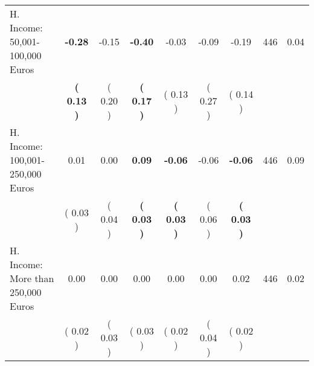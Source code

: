 \begin{tabular}{lcccccccc}
H. Income: 50,001-100,000 Euros & \textbf{    -0.28} &     -0.15 & \textbf{    -0.40} &     -0.03 &     -0.09 &     -0.19 & 446 &       0.04 \\ 
 & \textbf{(     0.13 )} & (     0.20 ) & \textbf{(     0.17 )} & (     0.13 ) & (     0.27 ) & (     0.14 ) & \\
H. Income: 100,001-250,000 Euros &      0.01 &      0.00 & \textbf{     0.09} & \textbf{    -0.06} &     -0.06 & \textbf{    -0.06} & 446 &       0.09 \\ 
 & (     0.03 ) & (     0.04 ) & \textbf{(     0.03 )} & \textbf{(     0.03 )} & (     0.06 ) & \textbf{(     0.03 )} & \\
H. Income: More than 250,000 Euros &      0.00 &      0.00 &      0.00 &      0.00 &      0.00 &      0.02 & 446 &       0.02 \\ 
 & (     0.02 ) & (     0.03 ) & (     0.03 ) & (     0.02 ) & (     0.04 ) & (     0.02 ) & \\
\bottomrule
\end{tabular}

